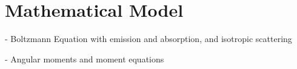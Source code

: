 \section{Mathematical Model}

  - Boltzmann Equation with emission and absorption, and isotropic scattering

  - Angular moments and moment equations